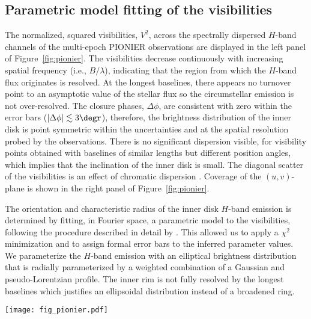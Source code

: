 \documentclass[twocolumn,tighten]{aastex61}
\begin{document}
\subsection{Parametric model fitting of the visibilities}\label{sec:fit}

The normalized, squared visibilities, $V^2$, across the spectrally dispersed $H$-band channels of the multi-epoch PIONIER observations are displayed in the left panel of Figure~\ref{fig:pionier}. The visibilities decrease continuously with increasing spatial frequency (i.e., \mbox{$B/\lambda$}), indicating that the region from which the $H$-band flux originates is resolved. At the longest baselines, there appears no turnover point to an asymptotic value of the stellar flux so the circumstellar emission is not over-resolved. The closure phases, $\Delta\phi$, are consistent with zero within the error bars ($\left|\Delta\phi\right|\lesssim 3\degr$), therefore, the brightness distribution of the inner disk is point symmetric within the uncertainties and at the spatial resolution probed by the observations. There is no significant dispersion visible, for visibility points obtained with baselines of similar lengths but different position angles, which implies that the inclination of the inner disk is small. The diagonal scatter of the visibilities is an effect of chromatic dispersion \citep{lazareff2017}. Coverage of the $(u,v)$-plane is shown in the right panel of Figure~\ref{fig:pionier}.

The orientation and characteristic radius of the inner disk $H$-band emission is determined by fitting, in Fourier space, a parametric model to the visibilities, following the procedure described in detail by \citet{lazareff2017}. This allowed us to apply a $\chi^2$ minimization and to assign formal error bars to the inferred parameter values. We parameterize the $H$-band emission with an elliptical brightness distribution that is radially parameterized by a weighted combination of a Gaussian and pseudo-Lorentzian profile. The inner rim is not fully resolved by the longest baselines which justifies an ellipsoidal distribution instead of a broadened ring.

\begin{figure*}
\centering
\texttt{[image: fig\_pionier.pdf]}
\caption{\emph{Left:} squared visibilities ($V^2$) of in the VLTI/PIONIER $H$-band channels with $\mathcal{R}\simeq40$ (top) and the fitting residuals of the ellipsoidal brightness model (bottom). \emph{Right}: coverage of the $(u,v)$-plane, shown with the same color coding as the visibilities.\label{fig:pionier}}
\end{figure*}
\end{document}
